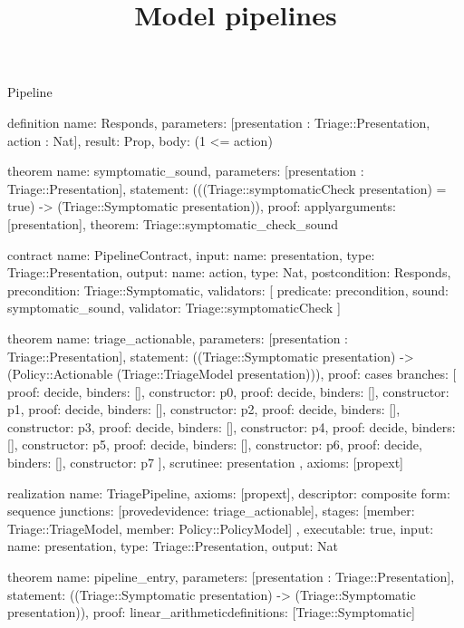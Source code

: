 \begin{lexlean}{Pipeline}
\title{Model pipelines}
\begin{semanticmodule}
definition{
  name: Responds,
  parameters: [presentation : Triage::Presentation, action : Nat],
  result: Prop,
  body: (1 <= action)
}

theorem{
  name: symptomatic_sound,
  parameters: [presentation : Triage::Presentation],
  statement: (((Triage::symptomaticCheck presentation) = true) -> (Triage::Symptomatic presentation)),
  proof: apply{arguments: [presentation], theorem: Triage::symptomatic_check_sound}
}

contract{
  name: PipelineContract,
  input: {name: presentation, type: Triage::Presentation},
  output: {name: action, type: Nat},
  postcondition: Responds,
  precondition: Triage::Symptomatic,
  validators: [
    {predicate: precondition, sound: symptomatic_sound, validator: Triage::symptomaticCheck}
  ]
}

theorem{
  name: triage_actionable,
  parameters: [presentation : Triage::Presentation],
  statement: ((Triage::Symptomatic presentation) -> (Policy::Actionable (Triage::TriageModel presentation))),
  proof: cases{
    branches: [
      {proof: decide{}, binders: [], constructor: p0},
      {proof: decide{}, binders: [], constructor: p1},
      {proof: decide{}, binders: [], constructor: p2},
      {proof: decide{}, binders: [], constructor: p3},
      {proof: decide{}, binders: [], constructor: p4},
      {proof: decide{}, binders: [], constructor: p5},
      {proof: decide{}, binders: [], constructor: p6},
      {proof: decide{}, binders: [], constructor: p7}
    ],
    scrutinee: presentation
  },
  axioms: [propext]
}

realization{
  name: TriagePipeline,
  axioms: [propext],
  descriptor: composite{
    form: sequence{
      junctions: [proved{evidence: triage_actionable}],
      stages: [{member: Triage::TriageModel}, {member: Policy::PolicyModel}]
    }
  },
  executable: true,
  input: {name: presentation, type: Triage::Presentation},
  output: Nat
}

theorem{
  name: pipeline_entry,
  parameters: [presentation : Triage::Presentation],
  statement: ((Triage::Symptomatic presentation) -> (Triage::Symptomatic presentation)),
  proof: linear_arithmetic{definitions: [Triage::Symptomatic]}
}


\end{semanticmodule}
\end{lexlean}
